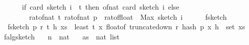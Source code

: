 \begin{isabellebody}
\ \ \ \ \ \ {\isacharparenleft}{\kern0pt}if\ card\ {\isacharparenleft}{\kern0pt}sketch\ i{\isacharparenright}{\kern0pt}\ {\isacharless}{\kern0pt}\ t\ then\ of{\isacharunderscore}{\kern0pt}nat\ {\isacharparenleft}{\kern0pt}card\ {\isacharparenleft}{\kern0pt}sketch\ i{\isacharparenright}{\kern0pt}{\isacharparenright}{\kern0pt}\ else\isanewline
\ \ \ \ \ \ \ \ rat{\isacharunderscore}{\kern0pt}of{\isacharunderscore}{\kern0pt}nat\ t{\isacharasterisk}{\kern0pt}\ rat{\isacharunderscore}{\kern0pt}of{\isacharunderscore}{\kern0pt}nat\ p\ {\isacharslash}{\kern0pt}\ rat{\isacharunderscore}{\kern0pt}of{\isacharunderscore}{\kern0pt}float\ \ {\isacharparenleft}{\kern0pt}Max\ {\isacharparenleft}{\kern0pt}sketch\ i{\isacharparenright}{\kern0pt}{\isacharparenright}{\kern0pt}{\isacharparenright}{\kern0pt}\isanewline
\ \ \ \ {\isacharparenright}{\kern0pt}{\isacharparenright}{\kern0pt}{\isachardoublequoteclose}\isanewline
\isanewline
{}\isamarkupfalse%
\ f{}{\isacharunderscore}{\kern0pt}sketch\ \ \isanewline
\ \ {\isachardoublequoteopen}f{}{\isacharunderscore}{\kern0pt}sketch\ p\ r\ t\ h\ xs\ {\isacharequal}{\kern0pt}\ least\ t\ {\isacharparenleft}{\kern0pt}{\isacharparenleft}{\kern0pt}{\isasymlambda}x{\isachardot}{\kern0pt}\ float{\isacharunderscore}{\kern0pt}of\ {\isacharparenleft}{\kern0pt}truncate{\isacharunderscore}{\kern0pt}down\ r\ {\isacharparenleft}{\kern0pt}hash\ p\ x\ h{\isacharparenright}{\kern0pt}{\isacharparenright}{\kern0pt}{\isacharparenright}{\kern0pt}\ {\isacharbackquote}{\kern0pt}\ {\isacharparenleft}{\kern0pt}set\ xs{\isacharparenright}{\kern0pt}{\isacharparenright}{\kern0pt}{\isachardoublequoteclose}\isanewline
\isanewline
{}\isamarkupfalse%
\ f{}{\isacharunderscore}{\kern0pt}alg{\isacharunderscore}{\kern0pt}sketch{\isacharcolon}{\kern0pt}\isanewline
\ \ \ n\ {\isacharcolon}{\kern0pt}{\isacharcolon}{\kern0pt}\ nat\isanewline
\ \ \ as\ {\isacharcolon}{\kern0pt}{\isacharcolon}{\kern0pt}\ {\isachardoublequoteopen}nat\ list{\isachardoublequoteclose}\isanewline
\ \ \ {\isachardoublequoteopen}{\isasymepsilon}\ {\isasymin}\ {\isacharbraceleft}{\kern0pt}{}{\isacharless}{\kern0pt}{\isachardot}{\kern0pt}{\isachardot}{\kern0pt}{\isacharless}{\kern0pt}{}{\isacharbraceright}{\kern0pt}{\isachardoublequoteclose}\isanewline
\ \ \ {\isachardoublequoteopen}{\isasymdelta}\ {\isasymin}\ {\isacharbraceleft}{\kern0pt}{}{\isacharless}{\kern0pt}{\isachardot}{\kern0pt}{\isachardot}{\kern0pt}{\isacharless}{\kern0pt}{}{\isacharbraceright}{\kern0pt}{\isachardoublequoteclose}\isanewline

\end{isabellebody}
